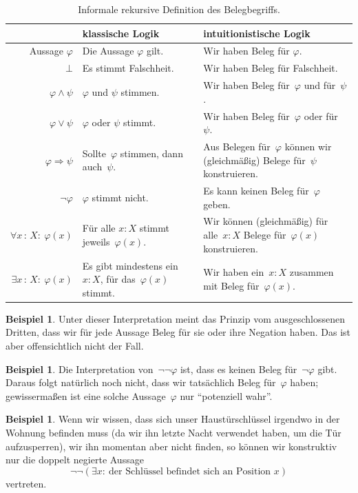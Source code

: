 \documentclass[a4paper,ngerman,12pt]{scrartcl}
\theoremstyle{definition}
\newtheorem{bsp}[defn]{Beispiel}
\theoremstyle{plain}
\theoremstyle{remark}
\renewcommand{\_}{\mathpunct{.}\,}
\newcommand{\?}{\,{:}\,}
\begin{document}
\begin{table}
  \centering
  \small
  \setlength{\extrarowheight}{0.3em}
  \begin{tabular}{@{}r|p{5.9cm}|p{6.5cm}}
    & {klassische Logik} & {intuitionistische Logik}
    \\\hline
    Aussage $\varphi$ & Die Aussage $\varphi$ gilt. & Wir haben Beleg für $\varphi$. \\
    $\bot$ & Es stimmt Falschheit. & Wir haben Beleg für Falschheit. \\
    $\varphi \wedge \psi$ & $\varphi$ und $\psi$ stimmen. & Wir haben Beleg für~$\varphi$ und für~$\psi$. \\
    $\varphi \vee \psi$ & $\varphi$ oder $\psi$ stimmt. & Wir haben Beleg für~$\varphi$ oder für~$\psi$. \\
    $\varphi \Rightarrow \psi$ & Sollte~$\varphi$ stimmen, dann auch~$\psi$. &
    Aus Belegen für~$\varphi$ können wir (gleichmäßig) Belege für~$\psi$ konstruieren. \\
    $\neg\varphi$ &
      $\varphi$ stimmt nicht. &
      Es kann keinen Beleg für~$\varphi$ geben. \\
    $\forall x\?X{:}\ \varphi(x)$ & Für alle $x : X$ stimmt jeweils~$\varphi(x).$ &
      Wir können (gleichmäßig) für alle~$x : X$ Belege für~$\varphi(x)$ konstruieren. \\
    $\exists x\?X{:}\ \varphi(x)$ & \raggedright Es gibt mindestens ein~$x : X$, für das~$\varphi(x)$
    stimmt. & {\raggedright
      Wir haben ein~$x : X$ zusammen mit Beleg für~$\varphi(x).$} \\
  \end{tabular}
  \caption{\label{bhk}Informale rekursive Definition des Belegbegriffs.}
\end{table}

\begin{bsp}
Unter dieser Interpretation meint das Prinzip vom ausgeschlossenen Dritten, dass wir für jede
Aussage Beleg für sie oder ihre Negation haben. Das ist aber offensichtlich
nicht der Fall.
\end{bsp}

\begin{bsp}
Die Interpretation von~$\neg\neg\varphi$ ist, dass es keinen Beleg
für~$\neg\varphi$ gibt. Daraus folgt natürlich noch nicht, dass wir tatsächlich
Beleg für~$\varphi$ haben; gewissermaßen ist eine solche Aussage~$\varphi$ nur
"`potenziell wahr"'.
\end{bsp}

\begin{bsp}Wenn wir wissen, dass sich unser Haustürschlüssel irgendwo in der
Wohnung befinden muss (da wir ihn letzte Nacht verwendet haben, um die Tür
aufzusperren), wir ihn momentan aber nicht finden, so können wir konstruktiv
nur die doppelt negierte Aussage
\[ \neg\neg (\exists x{:}\ \text{der Schlüssel befindet sich an Position~$x$})
\]
vertreten.\end{bsp}
\end{document}
